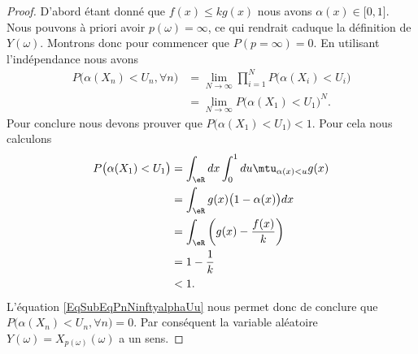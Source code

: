 \begin{proof}
	D'abord étant donné que \( f(x)\leq kg(x)\) nous avons \( \alpha(x)\in\mathopen[ 0 , 1 \mathclose]\). Nous pouvons à priori avoir \( p(\omega)=\infty\), ce qui rendrait caduque la définition de \( Y(\omega)\). Montrons donc pour commencer que \( P(p=\infty)=0\). En utilisant l'indépendance nous avons
	\begin{subequations}        \label{EqSubEqPnNinftyalphaUu}
		\begin{align}
			P\big( \alpha(X_n)<U_n,\forall n\big) & =\lim_{N\to \infty} \prod_{i=1}^NP\big( \alpha(X_i)< U_i \big) \\
			                                      & =\lim_{N\to \infty} P\big( \alpha(X_1)<U_1 \big)^N.
		\end{align}
	\end{subequations}
	Pour conclure nous devons prouver que \( P\big( \alpha(X_1)<U_1 \big)< 1\). Pour cela nous calculons
	\begin{subequations}
		\begin{align}
			P\big( \alpha(X_1)<U_1 \big) & =\int_{\eR}dx\int_0^1du\mtu_{\alpha(x)<u}g(x)     \\
			                             & =\int_{\eR}g(x)\big( 1-\alpha(x) \big)dx          \\
			                             & =\int_{\eR}\left( g(x)-\frac{ f(x) }{ k } \right) \\
			                             & =1-\frac{1}{ k }                                  \\
			                             & <1.
		\end{align}
	\end{subequations}
	L'équation \eqref{EqSubEqPnNinftyalphaUu} nous permet donc de conclure que \( P\big( \alpha(X_n)<U_n,\forall n\big)=0\). Par conséquent la variable aléatoire \( Y(\omega)=X_{p(\omega)}(\omega)\) a un sens.


\end{proof}

